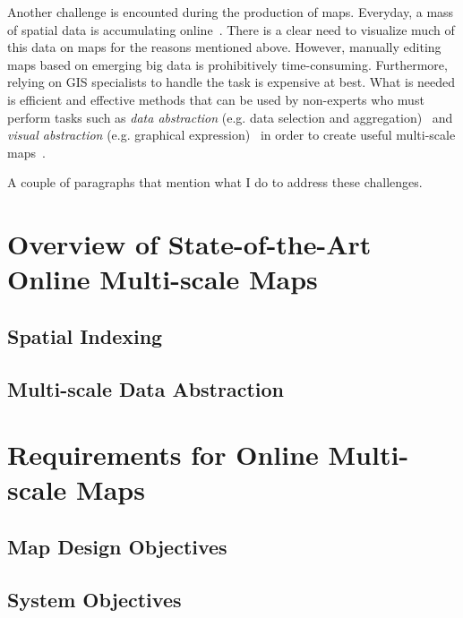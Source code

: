 \documentclass[11pt, oneside]{report}   	%
\begin{document}
Another challenge is encounted during the production of maps. Everyday, a mass of spatial data is accumulating online~\cite{agrawal2012bigdata}. There is a clear need to visualize much of this data on maps for the reasons mentioned above. However, manually editing maps based on emerging big data is prohibitively time-consuming. Furthermore, relying on GIS specialists to handle the task is expensive at best. What is needed is efficient and effective methods that can be used by non-experts who must perform tasks such as \emph{data abstraction} (e.g. data selection and aggregation)~\cite{haunert2006landcover,schmid2013opensciencemap} and \emph{visual abstraction} (e.g. graphical expression)~\cite{jacques1967semiologie} in order to create useful multi-scale maps~\cite{stolte2003multiscale,weibel1999generalising}. 

A couple of paragraphs that mention what I do to address these challenges. 


\section{Overview of State-of-the-Art Online Multi-scale Maps}
\subsection{Spatial Indexing}
\subsection{Multi-scale Data Abstraction}

\section{Requirements for Online Multi-scale Maps}
\subsection{Map Design Objectives}
\subsection{System Objectives}
\end{document}
